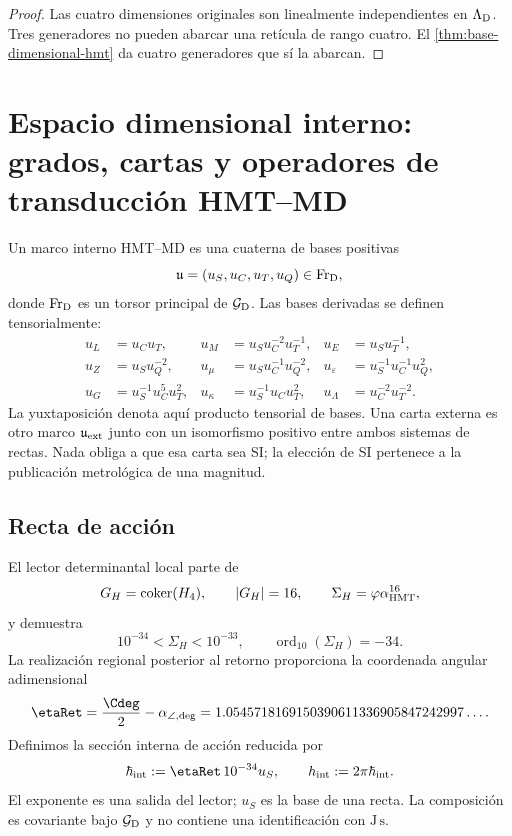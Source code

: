 \begin{proof}
Las cuatro dimensiones originales son linealmente independientes en
\(\Lambda_{\rm D}\). Tres generadores no pueden abarcar una retícula de
rango cuatro. El \cref{thm:base-dimensional-hmt} da cuatro generadores que
sí la abarcan.
\end{proof}

\section{Espacio dimensional interno: grados, cartas y operadores de transducción HMT–MD}

Un marco interno HMT--MD es una cuaterna de bases positivas
\[
 \mathfrak u=(u_S,u_C,u_T,u_Q)
 \in\operatorname{Fr}_{\rm D},
\]
donde \(\operatorname{Fr}_{\rm D}\) es un torsor principal de
\(\mathcal G_{\rm D}\). Las bases derivadas se definen tensorialmente:
\begin{align*}
 u_L&=u_Cu_T,&
 u_M&=u_Su_C^{-2}u_T^{-1},&
 u_E&=u_Su_T^{-1},\\
 u_Z&=u_Su_Q^{-2},&
 u_\mu&=u_Su_C^{-1}u_Q^{-2},&
 u_\varepsilon&=u_S^{-1}u_C^{-1}u_Q^2,\\
 u_G&=u_S^{-1}u_C^5u_T^2,&
 u_\kappa&=u_S^{-1}u_Cu_T^2,&
 u_\Lambda&=u_C^{-2}u_T^{-2}.
\end{align*}
La yuxtaposición denota aquí producto tensorial de bases. Una carta externa
es otro marco \(\mathfrak u_{\rm ext}\) junto con un isomorfismo positivo
entre ambos sistemas de rectas. Nada obliga a que esa carta sea SI; la
elección de SI pertenece a la publicación metrológica de una magnitud.

\subsection{Recta de acción}

El lector determinantal local parte de
\[
 G_H=\operatorname{coker}(H_4),
 \qquad |G_H|=16,
 \qquad \Sigma_H=\varphi\alpha_{\rm HMT}^{16},
\]
y demuestra
\[
 10^{-34}<\Sigma_H<10^{-33},
 \qquad \operatorname{ord}_{10}(\Sigma_H)=-34.
\]
La realización regional posterior al retorno proporciona la coordenada
angular adimensional
\[
 \etaRet
 =\frac{\Cdeg}{2}-\alpha_{\angle,{\rm deg}}
 =1.0545718169150390611336905847242997\ldots.
\]
Definimos la sección interna de acción reducida por
\begin{equation}
 \hbar_{\rm int}
 :=\etaRet\,10^{-34}u_S,
 \qquad
 h_{\rm int}:=2\pi\hbar_{\rm int}.
 \label{eq:accion-interna}
\end{equation}
El exponente es una salida del lector; \(u_S\) es la base de una recta.
La composición es covariante bajo \(\mathcal G_{\rm D}\) y no contiene una
identificación con \(\mathrm{J\,s}\).

